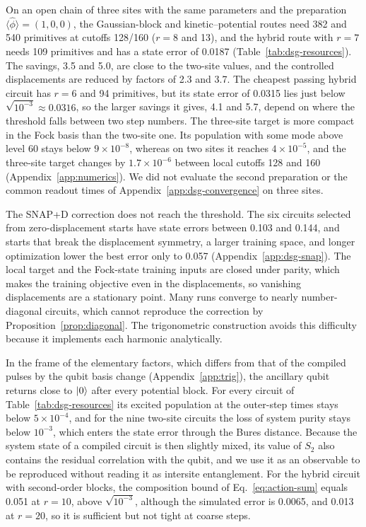 \documentclass[pra,twocolumn,superscriptaddress,nofootinbib,floatfix]{revtex4-2}
\theoremstyle{remark}
\begin{document}
On an open chain of three sites with the same parameters and the preparation \(\langle\hat\phi\rangle=(1,0,0)\), the Gaussian-block and kinetic--potential routes need 382 and 540 primitives at cutoffs 128/160 (\(r=8\) and 13), and the hybrid route with \(r=7\) needs 109 primitives and has a state error of 0.0187 (Table~\ref{tab:dsg-resources}). The savings, 3.5 and 5.0, are close to the two-site values, and the controlled displacements are reduced by factors of 2.3 and 3.7. The cheapest passing hybrid circuit has \(r=6\) and 94 primitives, but its state error of 0.0315 lies just below \(\sqrt{10^{-3}}\approx0.0316\), so the larger savings it gives, 4.1 and 5.7, depend on where the threshold falls between two step numbers. The three-site target is more compact in the Fock basis than the two-site one. Its population with some mode above level 60 stays below \(9\times10^{-8}\), whereas on two sites it reaches \(4\times10^{-5}\), and the three-site target changes by \(1.7\times10^{-6}\) between local cutoffs 128 and 160 (Appendix~\ref{app:numerics}). We did not evaluate the second preparation or the common readout times of Appendix~\ref{app:dsg-convergence} on three sites.

The SNAP+D correction does not reach the threshold. The six circuits selected from zero-displacement starts have state errors between 0.103 and 0.144, and starts that break the displacement symmetry, a larger training space, and longer optimization lower the best error only to 0.057 (Appendix~\ref{app:dsg-snap}). The local target and the Fock-state training inputs are closed under parity, which makes the training objective even in the displacements, so vanishing displacements are a stationary point. Many runs converge to nearly number-diagonal circuits, which cannot reproduce the correction by Proposition~\ref{prop:diagonal}. The trigonometric construction avoids this difficulty because it implements each harmonic analytically.

In the frame of the elementary factors, which differs from that of the compiled pulses by the qubit basis change (Appendix~\ref{app:trig}), the ancillary qubit returns close to \(\ket0\) after every potential block. For every circuit of Table~\ref{tab:dsg-resources} its excited population at the outer-step times stays below \(5\times10^{-4}\), and for the nine two-site circuits the loss of system purity stays below \(10^{-3}\), which enters the state error through the Bures distance. Because the system state of a compiled circuit is then slightly mixed, its value of \(S_2\) also contains the residual correlation with the qubit, and we use it as an observable to be reproduced without reading it as intersite entanglement. For the hybrid circuit with second-order blocks, the composition bound of Eq.~\eqref{eq:action-sum} equals 0.051 at \(r=10\), above \(\sqrt{10^{-3}}\), although the simulated error is 0.0065, and 0.013 at \(r=20\), so it is sufficient but not tight at coarse steps.
\end{document}
